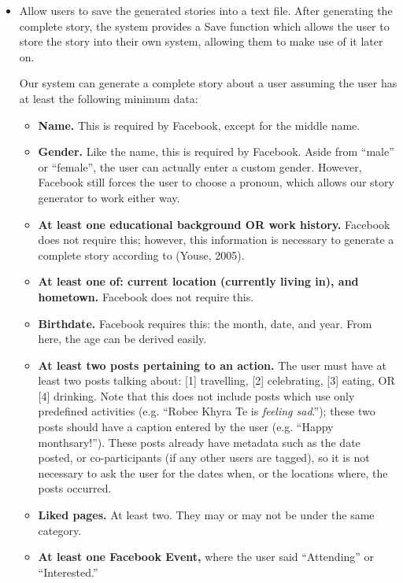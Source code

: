 \begin{itemize}
	\item Allow users to save the generated stories into a text file. \newline\newline
	After generating the complete story, the system provides a Save function which allows the user to store the story into their own system, allowing them to make use of it later on. \newline\newline
	
	Our system can generate a complete story about a user assuming the user has at least the following minimum data:
	\begin{itemize}
		\item \textbf{Name.} This is required by Facebook, except for the middle name.
		\item \textbf{Gender.} Like the name, this is required by Facebook. Aside from ``male” or ``female”, the user can actually enter a custom gender. However, Facebook still forces the user to choose a pronoun, which allows our story generator to work either way.
		\item \textbf{At least one educational background OR work history.} Facebook does not require this; however, this information is necessary to generate a complete story according to (Youse, 2005).
		\item \textbf{At least one of: current location (currently living in), and hometown.} Facebook does not require this.
		\item \textbf{Birthdate.} Facebook requires this: the month, date, and year. From here, the age can be derived easily.
		\item \textbf{At least two posts pertaining to an action.} The user must have at least two posts talking about: [1] travelling, [2] celebrating, [3] eating, OR [4] drinking. Note that this does not include posts which use only predefined activities (e.g. ``Robee Khyra Te is \textit{feeling sad}.''); these two posts should have a caption entered by the user (e.g. ``Happy monthsary!''). These posts already have metadata such as the date posted, or co-participants (if any other users are tagged), so it is not necessary to ask the user for the dates when, or the  locations where, the posts occurred.
		\item \textbf{Liked pages.} At least two. They may or may not be under the same category.
		\item \textbf{At least one Facebook Event,} where the user said ``Attending'' or ``Interested.''
	\end{itemize}
	

\end{itemize}

